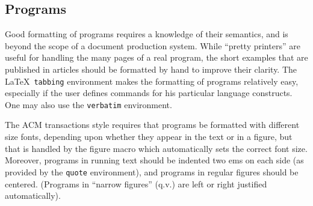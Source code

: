 \documentclass[hyperref]{acmtrans2e}
\begin{document}
\subsection{Programs}

Good formatting of programs requires a knowledge of their semantics,
and is beyond the scope of a document production system.  While
``pretty printers'' are useful for handling the many pages of a real
program, the short examples that are published in articles should be
formatted by hand to improve their clarity.  The \LaTeX\ {\tt tabbing}
environment makes the formatting of programs relatively easy,
especially if the user defines commands for his particular language
constructs.
One may also use the {\tt verbatim} environment.

The ACM transactions style requires that programs be formatted with
different size fonts, depending upon whether they appear in the text or
in a figure, but that is handled by the figure macro which
automatically sets the correct font size.
Moreover, programs in running text should be indented two ems 
on each side (as provided by the {\tt quote} environment), and
programs in regular figures should be centered.
(Programs in ``narrow figures'' (q.v.) are left or right justified
automatically).
\end{document}
